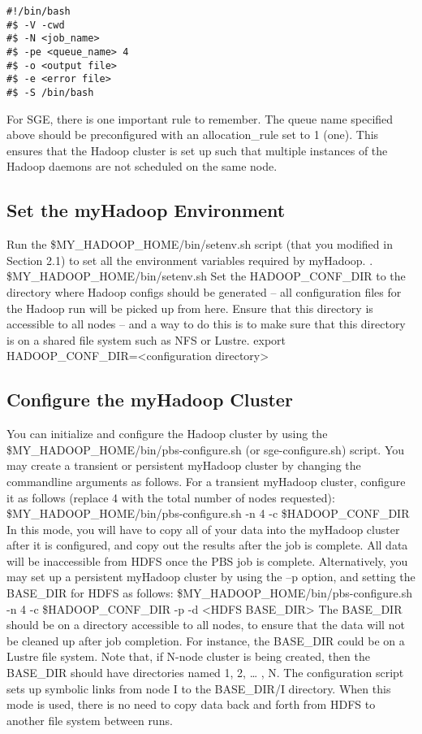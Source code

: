 \begin{verbatim}
#!/bin/bash
#$ -V -cwd
#$ -N <job_name>
#$ -pe <queue_name> 4
#$ -o <output file>
#$ -e <error file>
#$ -S /bin/bash
\end{verbatim}

For SGE, there is one important rule to remember. The queue name specified above
should be preconfigured with an allocation\_rule set to 1 (one). This ensures that the
Hadoop cluster is set up such that multiple instances of the Hadoop daemons are not
scheduled on the same node.

\subsection{Set the myHadoop Environment}

Run the \$MY\_HADOOP\_HOME/bin/setenv.sh script (that you modified in Section 2.1)
to set all the environment variables required by myHadoop.
. \$MY\_HADOOP\_HOME/bin/setenv.sh
Set the HADOOP\_CONF\_DIR to the directory where Hadoop configs should be
generated – all configuration files for the Hadoop run will be picked up from here. Ensure
that this directory is accessible to all nodes – and a way to do this is to make sure that this
directory is on a shared file system such as NFS or Lustre.
export HADOOP\_CONF\_DIR=<configuration directory>

\subsection{Configure the myHadoop Cluster}

You can initialize and configure the Hadoop cluster by using the
\$MY\_HADOOP\_HOME/bin/pbs-configure.sh (or sge-configure.sh) script. You may
create a transient or persistent myHadoop cluster by changing the commandline
arguments as follows.
For a transient myHadoop cluster, configure it as follows (replace 4 with the total number
of nodes requested):
\$MY\_HADOOP\_HOME/bin/pbs-configure.sh -n 4 -c \$HADOOP\_CONF\_DIR
In this mode, you will have to copy all of your data into the myHadoop cluster after it is
configured, and copy out the results after the job is complete. All data will be
inaccessible from HDFS once the PBS job is complete.
Alternatively, you may set up a persistent myHadoop cluster by using the –p option, and
setting the BASE\_DIR for HDFS as follows:
\$MY\_HADOOP\_HOME/bin/pbs-configure.sh -n 4 -c \$HADOOP\_CONF\_DIR -p -d
<HDFS BASE\_DIR>
The BASE\_DIR should be on a directory accessible to all nodes, to ensure that the data
will not be cleaned up after job completion. For instance, the BASE\_DIR could be on a
Lustre file system. Note that, if N-node cluster is being created, then the BASE\_DIR
should have directories named 1, 2, … , N. The configuration script sets up symbolic
links from node I to the BASE\_DIR/I directory. When this mode is used, there is no need
to copy data back and forth from HDFS to another file system between runs.

